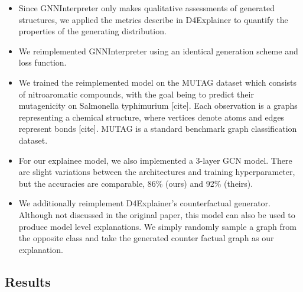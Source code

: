 \documentclass[
  11pt,
  letterpaper,
]{article}
\begin{document}
\begin{itemize}
\item
  Since GNNInterpreter only makes qualitative assessments of generated
  structures, we applied the metrics describe in D4Explainer to quantify
  the properties of the generating distribution.
\item
  We reimplemented GNNInterpreter using an identical generation scheme
  and loss function.
\item
  We trained the reimplemented model on the MUTAG dataset which consists
  of nitroaromatic compounds, with the goal being to predict their
  mutagenicity on Salmonella typhimurium {[}cite{]}. Each observation is
  a graphs representing a chemical structure, where vertices denote
  atoms and edges represent bonds {[}cite{]}. MUTAG is a standard
  benchmark graph classification dataset.
\item
  For our explainee model, we also implemented a 3-layer GCN model.
  There are slight variations between the architectures and training
  hyperparameter, but the accuracies are comparable, 86\% (ours) and
  92\% (theirs).
\item
  We additionally reimplement D4Explainer's counterfactual generator.
  Although not discussed in the original paper, this model can also be
  used to produce model level explanations. We simply randomly sample a
  graph from the opposite class and take the generated counter factual
  graph as our explanation.
\end{itemize}

\hypertarget{results}{%
\subsection{Results}\label{results}}
\end{document}
